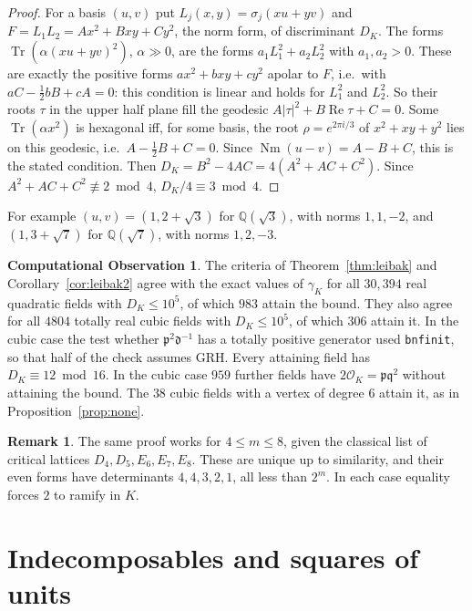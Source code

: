 \documentclass[11pt,reqno]{amsart}
\theoremstyle{plain}
\theoremstyle{definition}
\newtheorem{remark}[theorem]{Remark}
\newtheorem{observation}[theorem]{Computational Observation}
\newcommand{\Q}{\mathbb{Q}}
\newcommand{\Nm}{\operatorname{Nm}}
\newcommand{\Tr}{\operatorname{Tr}}
\begin{document}
\begin{proof}
For a basis $(u,v)$ put $L_j(x,y)=\sigma_j(xu+yv)$ and $F=L_1L_2=Ax^2+Bxy+Cy^2$, the norm form, of
discriminant $D_K$. The forms $\Tr(\alpha(xu+yv)^2)$, $\alpha\gg0$, are the forms $a_1L_1^2+a_2L_2^2$ with
$a_1,a_2>0$. These are exactly the positive forms $ax^2+bxy+cy^2$ apolar to $F$, i.e.\ with
$aC-\tfrac12bB+cA=0$: this condition is linear and holds for $L_1^2$ and $L_2^2$. So their roots $\tau$ in
the upper half plane fill the geodesic $A|\tau|^2+B\operatorname{Re}\tau+C=0$. Some $\Tr(\alpha x^2)$ is
hexagonal iff, for some basis, the root $\rho=e^{2\pi i/3}$ of $x^2+xy+y^2$ lies on this geodesic, i.e.\
$A-\tfrac12B+C=0$. Since $\Nm(u-v)=A-B+C$, this is the stated condition. Then
$D_K=B^2-4AC=4(A^2+AC+C^2)$. Since $A^2+AC+C^2\not\equiv2\bmod4$, $D_K/4\equiv3\bmod4$.
\end{proof}

For example $(u,v)=(1,2+\sqrt3)$ for $\Q(\sqrt3)$, with norms $1,1,-2$, and $(1,3+\sqrt7)$ for $\Q(\sqrt7)$,
with norms $1,2,-3$.

\begin{observation}\label{obs:leibak}
The criteria of Theorem~\ref{thm:leibak} and Corollary~\ref{cor:leibak2} agree with the exact values of
$\gamma_K$ for all $30{,}394$ real quadratic fields with $D_K\le10^5$, of which $983$ attain the bound. They
also agree for all $4804$ totally real cubic fields with $D_K\le10^5$, of which $306$ attain it. In the cubic
case the test whether $\mathfrak p^2\mathfrak d^{-1}$ has a totally positive generator used \texttt{bnfinit},
so that half of the check assumes GRH. Every attaining field has $D_K\equiv12\bmod16$. In the cubic case
$959$ further fields have $2\mathcal O_K=\mathfrak p\mathfrak q^2$ without attaining the bound. The
$38$ cubic fields with a vertex of degree $6$ attain it, as in Proposition~\ref{prop:none}.
\end{observation}

\begin{remark}
The same proof works for $4\le m\le8$, given the classical list of critical lattices $D_4,D_5,E_6,E_7,E_8$.
These are unique up to similarity, and their even forms have determinants $4,4,3,2,1$, all less than
$2^m$. In each case equality forces $2$ to ramify in $K$.
\end{remark}

\section{Indecomposables and squares of units}\label{sec:indecsq}
\end{document}
